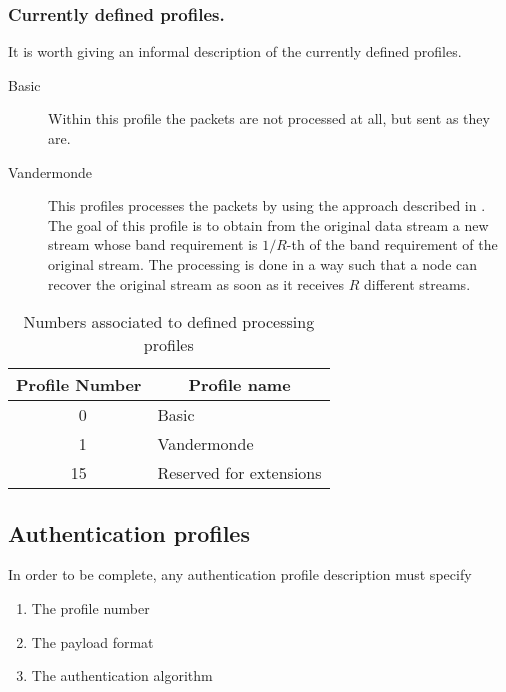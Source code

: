 \documentclass{rfc}
\begin{document}
\subsubsection{Currently defined profiles.}
\label{subsub:0.0.4.0.0;transport_layer}

It is worth  giving an informal description of the currently defined
profiles. 

\begin{description}
\item[Basic]  Within this profile the packets are not processed at
  all, but sent as they are.
\item[Vandermonde] This profiles processes the packets by using the
  approach described in \cite{bernardini08:dcc08}.  The goal of this
  profile is to obtain from the original data stream a new stream
  whose band requirement is $1/R$-th of the band requirement of the
  original stream.  The processing is done in a way such that a node
  can recover the original stream as soon as it receives $R$ different
  streams. 
\end{description}
%
\begin{table}
\caption{Numbers associated to defined processing profiles
\label{table:proc_profiles}}
\begin{center}
  \begin{tabular}{|c|l|}
\hline
    \multicolumn{1}{|p{3.3em}}{Profile Number} &
    \multicolumn{1}{|c|}{Profile name} \\
\hline
\hline
   ~0 & Basic \\ \hline
   ~1 & Vandermonde \\ \hline
   15 & Reserved for extensions \\ 
\hline
  \end{tabular}
\end{center}
\end{table}
%
\subsection{Authentication profiles}
\label{sub:0.0.4.1;transport_layer}

In order to be complete, any authentication profile description must
specify

\begin{enumerate}
\item
The profile number
\item
The payload format
\item
The authentication algorithm
\end{enumerate}
%
\end{document}
